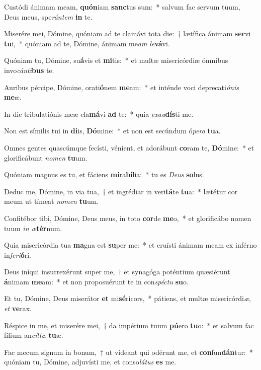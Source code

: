 \item Custódi ánimam meam, \textbf{quón}iam \textbf{sanc}tus sum:~* salvum fac servum tuum, Deus meus, spe\textit{rán}\textit{tem} \textbf{in} te.
\item Miserére mei, Dómine, quóniam ad te clamávi tota die:~† lætífica ánimam \textbf{ser}vi \textbf{tu}i,~* quóniam ad te, Dómine, ánimam me\textit{am} \textit{le}\textbf{vá}vi.
\item Quóniam tu, Dómine, su\textbf{á}vis et \textbf{mi}tis:~* et multæ misericórdiæ ómnibus invo\textit{cán}\textit{ti}\textbf{bus} te.
\item Auribus pércipe, Dómine, orati\textbf{ó}nem \textbf{me}am:~* et inténde voci deprecati\textit{ó}\textit{nis} \textbf{me}æ.
\item In die tribulatiónis meæ cla\textbf{má}vi \textbf{ad} te:~* quia \textit{ex}\textit{au}\textbf{dís}ti me.
\item Non est símilis tui in \textbf{di}is, \textbf{Dó}mine:~* et non est secúndum ó\textit{pe}\textit{ra} \textbf{tu}a.
\item Omnes gentes quascúmque fecísti, vénient, et adorábunt \textbf{co}ram te, \textbf{Dó}mine:~* et glorificábunt \textit{no}\textit{men} \textbf{tu}um.
\item Quóniam magnus es tu, et fáciens \textbf{mi}ra\textbf{bí}lia:~* tu es \textit{De}\textit{us} \textbf{so}lus.
\item Deduc me, Dómine, in via tua,~† et ingrédiar in veri\textbf{tá}te \textbf{tu}a:~* lætétur cor meum ut tímeat \textit{no}\textit{men} \textbf{tu}um.
\item Confitébor tibi, Dómine, Deus meus, in toto \textbf{cor}de \textbf{me}o,~* et glorificábo nomen tuum \textit{in} \textit{æ}\textbf{tér}num.
\item Quia misericórdia tua \textbf{ma}gna est \textbf{su}per me:~* et eruísti ánimam meam ex inférno in\textit{fe}\textit{ri}\textbf{ó}ri.
\item Deus iníqui insurrexérunt super me,~† et synagóga poténtium quæsiérunt \textbf{á}nimam \textbf{me}am:~* et non proposuérunt te in con\textit{spéc}\textit{tu} \textbf{su}o.
\item Et tu, Dómine, Deus miserátor \textbf{et} mi\textbf{sé}ricors,~* pátiens, et multæ misericórdi\textit{æ}, \textit{et} \textbf{ve}rax.
\item Réspice in me, et miserére mei,~† da impérium tuum \textbf{pú}ero \textbf{tu}o:~* et salvum fac fílium an\textit{cíl}\textit{læ} \textbf{tu}æ.
\item Fac mecum signum in bonum,~† ut vídeant qui odérunt me, et \textbf{con}fun\textbf{dán}tur:~* quóniam tu, Dómine, adjuvísti me, et conso\textit{lá}\textit{tus} \textbf{es} me.
